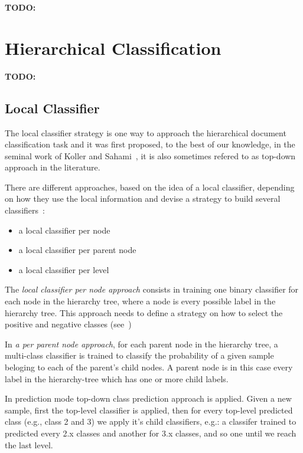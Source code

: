\documentclass[11pt]{article}
\begin{document}


\textbf{TODO:}


\section{Hierarchical Classification}


\textbf{TODO:}

\subsection{Local Classifier}

The local classifier strategy is one way to approach the hierarchical document classification task
and it was first proposed, to the best of our knowledge, in the seminal work of Koller and
Sahami~, it is also sometimes refered to as top-down
approach in the literature.

There are different approaches, based on the idea of a local classifier, depending on how they use
the local information and devise a strategy to build several classifiers~\cite{Silla:2011:SHC:1937796.1937884}:

\begin{itemize}
\item{a local classifier per node}
\item{a local classifier per parent node}
\item{a local classifier per level}
\end{itemize}


The \textit{local classifier per node approach} consists in training one binary classifier for each
node in the hierarchy tree, where a node is every possible label in the hierarchy tree. This
approach needs to define a strategy on how to select the positive and negative classes (see~\cite{})


In \textit{a per parent node approach}, for each parent node in the hierarchy tree, a multi-class
classifier is trained to classify the probability of a given sample beloging to each of the parent's
child nodes. A parent node is in this case every label in the hierarchy-tree which has one or more
child labels.

In prediction mode top-down class prediction approach is applied. Given a new sample, first the
top-level classifier is applied, then for every top-level predicted class (e.g., class 2 and 3)
we apply it's child classifiers, e.g.: a classifer trained to predicted every 2.x classes and
another for 3.x classes, and so one until we reach the last level.
\end{document}
